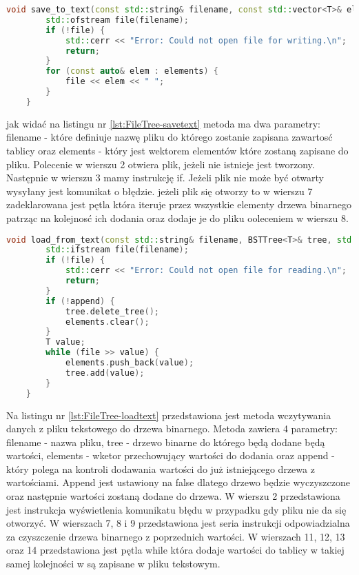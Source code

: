 \begin{lstlisting}[caption=Metoda \texttt{save\_to\_file}, label={lst:FileTree-savetext}, language=C++]
	void save_to_text(const std::string& filename, const std::vector<T>& elements) {
		std::ofstream file(filename);
		if (!file) {
			std::cerr << "Error: Could not open file for writing.\n";
			return;
		}
		for (const auto& elem : elements) {
			file << elem << " ";
		}
	}
\end{lstlisting}
jak widać na listingu nr \ref{lst:FileTree-savetext} metoda ma dwa parametry: filename - które definiuje nazwę pliku do którego zostanie zapisana zawartosć tablicy oraz elements - który jest wektorem elementów które zostaną zapisane do pliku. Polecenie w wierszu 2 otwiera plik, jeżeli nie istnieje jest tworzony.
Następnie w wierszu 3 mamy instrukcję if. Jeżeli plik nie może być otwarty wysyłany jest komunikat o błędzie. jeżeli plik się otworzy to w wierszu 7 zadeklarowana jest pętla która iteruje przez wszystkie elementy drzewa binarnego patrząc na kolejnosć ich dodania oraz dodaje je do pliku ooleceniem w wierszu 8.


\begin{lstlisting}[caption=Metoda \texttt{load\_to\_file}, label={lst:FileTree-loadtext}, language=C++]
	void load_from_text(const std::string& filename, BSTTree<T>& tree, std::vector<T>& elements, bool append = false) {
		std::ifstream file(filename);
		if (!file) {
			std::cerr << "Error: Could not open file for reading.\n";
			return;
		}
		if (!append) {
			tree.delete_tree();
			elements.clear();
		}
		T value;
		while (file >> value) {
			elements.push_back(value);
			tree.add(value);
		}
	}
\end{lstlisting}

Na listingu nr \ref{lst:FileTree-loadtext} przedstawiona jest metoda wczytywania danych z pliku tekstowego do drzewa binarnego. Metoda zawiera 4 parametry: filename - nazwa pliku, tree - drzewo binarne do którego będą dodane będą wartości, elements - wketor przechowujący wartości do dodania oraz append - który polega na kontroli dodawania wartości do już istniejącego drzewa z wartościami. Append jest ustawiony na false dlatego drzewo będzie wyczyszczone oraz następnie wartości zostaną dodane do drzewa.
W wierszu 2 przedstawiona jest instrukcja wyświetlenia komunikatu błędu w przypadku gdy pliku nie da się otworzyć.
W wierszach 7, 8 i 9 przedstawiona jest seria instrukcji odpowiadzialna za czyszczenie drzewa binarnego z poprzednich wartości.
W wierszach 11, 12, 13 oraz 14 przedstawiona jest pętla while która dodaje wartości do tablicy w takiej samej kolejności w są zapisane w pliku tekstowym.

